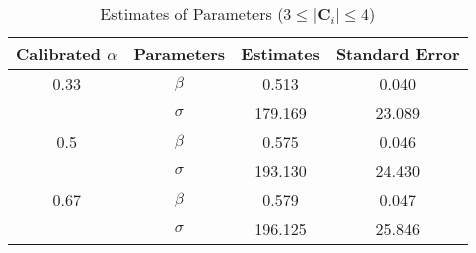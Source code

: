 \begin{table}[H]
\centering
\caption{Estimates of Parameters ($3 \leq |\mathbf{C}_i| \leq 4$)}
\label{table: estimates (min_size=3 max_size=4 margin=2000)}
\begin{tabular}{cccc}
\toprule
Calibrated $\alpha$ & Parameters & Estimates & Standard Error \\
\midrule
0.33 & $\beta$ & 0.513 & 0.040 \\
 & $\sigma$ & 179.169 & 23.089 \\
0.5 & $\beta$ & 0.575 & 0.046 \\
 & $\sigma$ & 193.130 & 24.430 \\
0.67 & $\beta$ & 0.579 & 0.047 \\
 & $\sigma$ & 196.125 & 25.846 \\
\bottomrule
\end{tabular}
\end{table}
